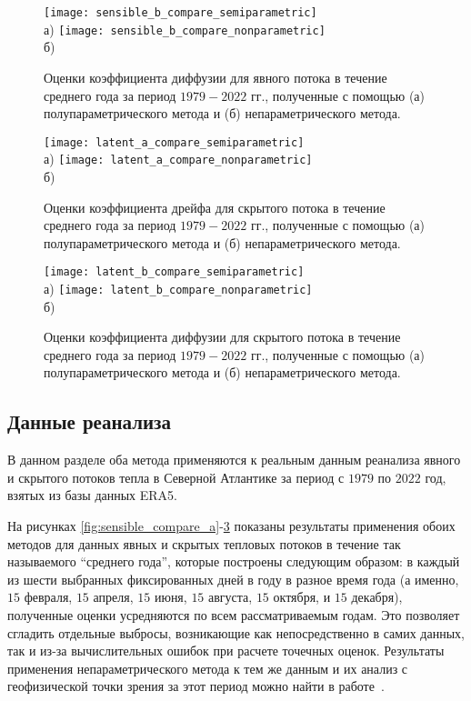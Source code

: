\begin{figure}[!h]
	\centering
	\texttt{[image: sensible\_b\_compare\_semiparametric]}\\
	а)
	\texttt{[image: sensible\_b\_compare\_nonparametric]}\\
	б)
	\caption{Оценки коэффициента диффузии для явного потока в течение среднего года за период $1979-2022$ гг., полученные с помощью (а) полупараметрического метода и (б) непараметрического метода.} 
	\label{fig:sensible_compare_b}
\end{figure}

\begin{figure}[!h]
	\centering
	\texttt{[image: latent\_a\_compare\_semiparametric]}\\
	а)
	\texttt{[image: latent\_a\_compare\_nonparametric]}\\
	б)
	\caption{Оценки коэффициента дрейфа для скрытого потока в течение среднего года за период $1979-2022$ гг., полученные с помощью (а) полупараметрического метода и (б) непараметрического метода.} 
	\label{fig:latent_compare_a}
\end{figure}


\begin{figure}[!h]
	\centering
	\texttt{[image: latent\_b\_compare\_semiparametric]}\\
	а)
	\texttt{[image: latent\_b\_compare\_nonparametric]}\\
	б)
	\caption{Оценки коэффициента диффузии для скрытого потока в течение среднего года за период $1979-2022$ гг., полученные с помощью (а) полупараметрического метода и (б) непараметрического метода.} 
	\label{fig:latent_compare_b}
\end{figure}

\subsection{Данные реанализа}
В данном разделе оба метода применяются к реальным данным реанализа явного и скрытого потоков тепла в Северной Атлантике за период с $1979$ по $2022$ год, взятых из базы данных ERA5.

На рисунках \ref{fig:sensible_compare_a}-\ref{fig:latent_compare_b} показаны результаты применения обоих методов для данных явных и скрытых тепловых потоков в течение так называемого “среднего года”, которые построены следующим образом: в каждый из шести выбранных фиксированных дней в году в разное время года (а именно, $15$ февраля, $15$ апреля, $15$ июня, $15$ августа, $15$ октября, и $15$ декабря), полученные оценки усредняются по всем рассматриваемым годам. Это позволяет сгладить отдельные выбросы, возникающие как непосредственно в самих данных, так и из-за вычислительных ошибок при расчете точечных оценок. Результаты применения непараметрического метода к тем же данным и их анализ с геофизической точки зрения за этот период можно найти в работе~\cite{gorshenin2023stochastic}.

